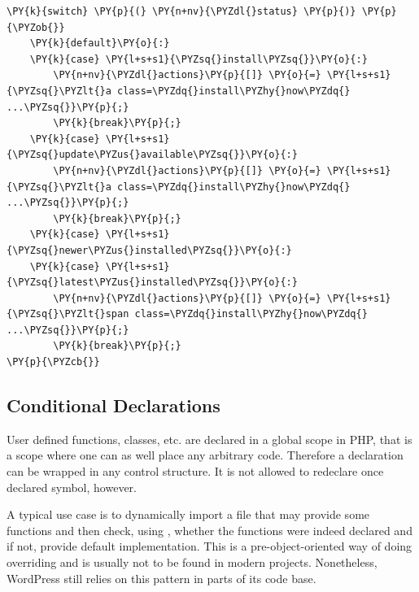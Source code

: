\begin{Verbatim}[commandchars=\\\{\}]
\PY{k}{switch} \PY{p}{(} \PY{n+nv}{\PYZdl{}status} \PY{p}{)} \PY{p}{\PYZob{}}
    \PY{k}{default}\PY{o}{:}
    \PY{k}{case} \PY{l+s+s1}{\PYZsq{}install\PYZsq{}}\PY{o}{:}
        \PY{n+nv}{\PYZdl{}actions}\PY{p}{[]} \PY{o}{=} \PY{l+s+s1}{\PYZsq{}\PYZlt{}a class=\PYZdq{}install\PYZhy{}now\PYZdq{} ...\PYZsq{}}\PY{p}{;}
        \PY{k}{break}\PY{p}{;}
    \PY{k}{case} \PY{l+s+s1}{\PYZsq{}update\PYZus{}available\PYZsq{}}\PY{o}{:}
        \PY{n+nv}{\PYZdl{}actions}\PY{p}{[]} \PY{o}{=} \PY{l+s+s1}{\PYZsq{}\PYZlt{}a class=\PYZdq{}install\PYZhy{}now\PYZdq{} ...\PYZsq{}}\PY{p}{;}
        \PY{k}{break}\PY{p}{;}
    \PY{k}{case} \PY{l+s+s1}{\PYZsq{}newer\PYZus{}installed\PYZsq{}}\PY{o}{:}
    \PY{k}{case} \PY{l+s+s1}{\PYZsq{}latest\PYZus{}installed\PYZsq{}}\PY{o}{:}
        \PY{n+nv}{\PYZdl{}actions}\PY{p}{[]} \PY{o}{=} \PY{l+s+s1}{\PYZsq{}\PYZlt{}span class=\PYZdq{}install\PYZhy{}now\PYZdq{} ...\PYZsq{}}\PY{p}{;}
        \PY{k}{break}\PY{p}{;}
\PY{p}{\PYZcb{}}
\end{Verbatim}
    
    
    \subsection{Conditional Declarations}
    User defined functions, classes, etc. are declared in 
    a global scope in PHP, that is a scope where one can 
    as well place any arbitrary code. Therefore a declaration 
    can be wrapped in any control structure. 
    It is not allowed to redeclare once declared symbol, however.
    
    A typical use case is to dynamically import a file 
    that may provide some functions and then check, 
    using , whether the functions were 
    indeed declared and if not, provide default implementation.
    This is a pre-object-oriented way of doing overriding and 
    is usually not to be found in modern projects. Nonetheless, 
    WordPress still relies on this pattern in parts of its code base.
    
